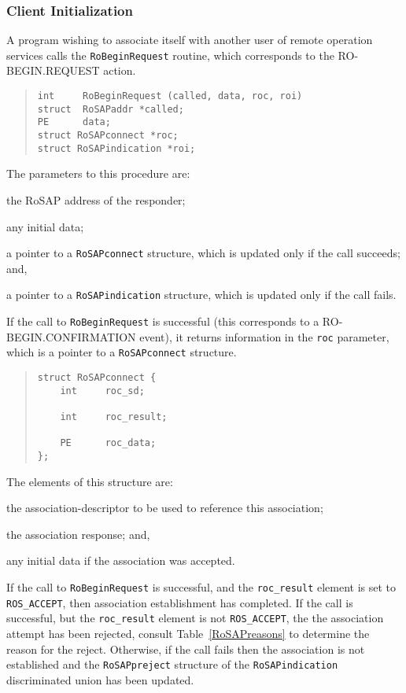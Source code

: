 \subsubsection     {Client Initialization}
A program wishing to associate itself with another user of remote operation
services calls the \verb"RoBeginRequest" routine,
which corresponds to the {\sf RO-BEGIN.REQUEST\/} action.
\begin{quote}\small\begin{verbatim}
int     RoBeginRequest (called, data, roc, roi)
struct  RoSAPaddr *called;
PE      data;
struct RoSAPconnect *roc;
struct RoSAPindication *roi;
\end{verbatim}\end{quote}
The parameters to this procedure are:
\begin{describe}
\item[\verb"called":] the RoSAP address of the responder;

\item[\verb"data":] any initial data;

\item[\verb"roc":] a pointer to a \verb"RoSAPconnect" structure, which is
updated only if the call succeeds;
and,

\item[\verb"roi":] a pointer to a \verb"RoSAPindication" structure, which is
updated only if the call fails.
\end{describe}
If the call to \verb"RoBeginRequest" is successful
(this corresponds to a {\sf RO-BEGIN.CONFIRMATION\/} event),
it returns information in the \verb"roc" parameter,
which is a pointer to a \verb"RoSAPconnect" structure.
\begin{quote}\small\begin{verbatim}
struct RoSAPconnect {
    int     roc_sd;

    int     roc_result;

    PE      roc_data;
};
\end{verbatim}\end{quote}
The elements of this structure are:
\begin{describe}
\item[\verb"roc\_sd":] the association-descriptor to be used to
reference this association;

\item[\verb"roc\_result":] the association response;
and,

\item[\verb"roc\_data":] any initial data if the association was accepted.
\end{describe}
If the call to \verb"RoBeginRequest" is successful,
and the \verb"roc_result" element is set to \verb"ROS_ACCEPT",
then association establishment has completed.
If the call is successful,
but the \verb"roc_result" element is not \verb"ROS_ACCEPT",
the the association attempt has been rejected,
consult Table~\ref{RoSAPreasons} to determine the reason for the reject.
Otherwise, if the call fails then the association is not established and
the \verb"RoSAPpreject" structure of the \verb"RoSAPindication" discriminated
union has been updated.

